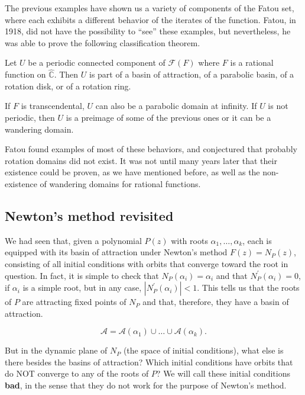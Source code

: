 \documentclass[12pt, a4paper]{article}
\begin{document}
The previous examples have shown us a variety of components of the Fatou set,
where each exhibits a different behavior of the iterates of the function. Fatou,
in 1918, did not have the possibility to ``see'' these examples, but
nevertheless, he was able to prove the following classification theorem.

\begin{theorem}[Fatou, 1918]
Let $U$ be a periodic connected component of $\mathcal{F}(F)$ where $F$ is a
rational function on $\hat{\mathbb{C}}$. Then $U$ is part of a basin of
attraction, of a parabolic basin, of a rotation disk, or of a rotation ring.
\end{theorem}

If $F$ is transcendental, $U$ can also be a parabolic domain at infinity. If $U$
is not periodic, then $U$ is a preimage of some of the previous ones or it can
be a wandering domain.

Fatou found examples of most of these behaviors, and conjectured that probably
rotation domains did not exist. It was not until many years later that their
existence could be proven, as we have mentioned before, as well as the
non-existence of wandering domains for rational functions.

\subsection{Newton's method revisited}

We had seen that, given a polynomial $P(z)$ with roots $\alpha_{1}, \dots,
\alpha_{k}$, each is equipped with its basin of attraction under Newton's method
$F(z)=N_{P}(z)$, consisting of all initial conditions with orbits that converge
toward the root in question. In fact, it is simple to check that
$N_{P}(\alpha_{i})=\alpha_{i}$ and that $N_{P}^{\prime}(\alpha_{i})=0$, if
$\alpha_{i}$ is a simple root, but in any case,
$|N_{P}^{\prime}(\alpha_{i})|<1$. This tells us that the roots of $P$ are
attracting fixed points of $N_{P}$ and that, therefore, they have a basin of
attraction.

\begin{equation*}
    \mathcal{A}=\mathcal{A}(\alpha_{1})\cup\dots\cup\mathcal{A}(\alpha_{k}).
\end{equation*}

But in the dynamic plane of $N_{P}$ (the space of initial conditions), what else
is there besides the basins of attraction? Which initial conditions have orbits
that do NOT converge to any of the roots of $P$? We will call these initial
conditions \textbf{bad}, in the sense that they do not work for the purpose of
Newton's method.
\end{document}
